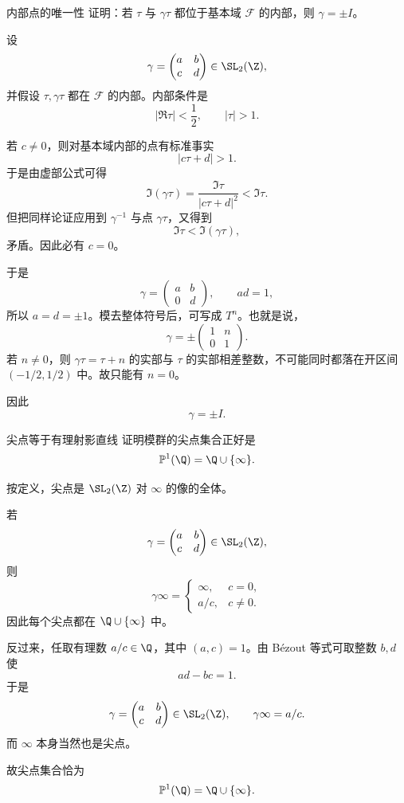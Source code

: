 \begin{problem}{内部点的唯一性}
\hard
证明：若 $\tau$ 与 $\gamma\tau$ 都位于基本域 $\mathcal{F}$ 的内部，则 $\gamma=\pm I$。
\end{problem}
\begin{solution}
设
\[
\gamma=\begin{pmatrix}a&b\\c&d\end{pmatrix}\in\SL_2(\Z),
\]
并假设 $\tau,\gamma\tau$ 都在 $\mathcal{F}$ 的内部。内部条件是
\[
|\Re\tau|<\frac12,
\qquad
|\tau|>1.
\]

若 $c\neq 0$，则对基本域内部的点有标准事实
\[
|c\tau+d|>1.
\]
于是由虚部公式可得
\[
\Im(\gamma\tau)=\frac{\Im\tau}{|c\tau+d|^2}<\Im\tau.
\]
但把同样论证应用到 $\gamma^{-1}$ 与点 $\gamma\tau$，又得到
\[
\Im\tau<\Im(\gamma\tau),
\]
矛盾。因此必有 $c=0$。

于是
\[
\gamma=\begin{pmatrix}a&b\\0&d\end{pmatrix},
\qquad ad=1,
\]
所以 $a=d=\pm1$。模去整体符号后，可写成 $T^n$。也就是说，
\[
\gamma=\pm \begin{pmatrix}1&n\\0&1\end{pmatrix}.
\]
若 $n\neq 0$，则 $\gamma\tau=\tau+n$ 的实部与 $\tau$ 的实部相差整数，不可能同时都落在开区间 $(-1/2,1/2)$ 中。故只能有 $n=0$。

因此
\[
\gamma=\pm I.
\]
\end{solution}

\begin{problem}{尖点等于有理射影直线}
\hard
证明模群的尖点集合正好是
\[
\mathbb{P}^1(\Q)=\Q\cup\{\infty\}.
\]
\end{problem}
\begin{solution}
按定义，尖点是 $\SL_2(\Z)$ 对 $\infty$ 的像的全体。

若
\[
\gamma=\begin{pmatrix}a&b\\c&d\end{pmatrix}\in\SL_2(\Z),
\]
则
\[
\gamma\infty=
\begin{cases}
\infty,& c=0,\\[4pt]
a/c,& c\neq 0.
\end{cases}
\]
因此每个尖点都在 $\Q\cup\{\infty\}$ 中。

反过来，任取有理数 $a/c\in\Q$，其中 $(a,c)=1$。由 Bézout 等式可取整数 $b,d$ 使
\[
ad-bc=1.
\]
于是
\[
\gamma=\begin{pmatrix}a&b\\c&d\end{pmatrix}\in\SL_2(\Z),
\qquad
\gamma\infty=a/c.
\]
而 $\infty$ 本身当然也是尖点。

故尖点集合恰为
\[
\mathbb{P}^1(\Q)=\Q\cup\{\infty\}.
\]
\end{solution}

